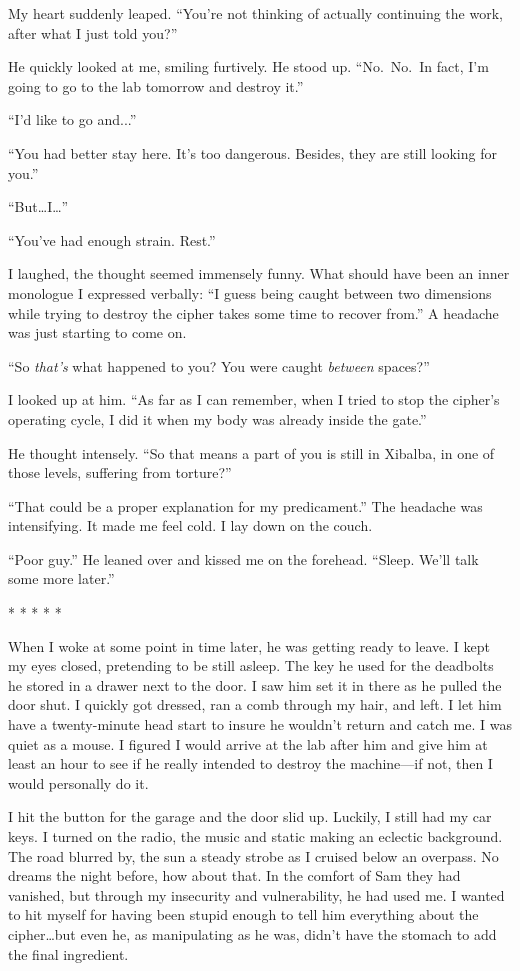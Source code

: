 \documentclass[
]{article}
\begin{document}
My heart suddenly leaped. ``You're not thinking of actually continuing
the work, after what I just told you?''

He quickly looked at me, smiling furtively. He stood up. ``No.~No.~In
fact, I'm going to go to the lab tomorrow and destroy it.''

``I'd like to go and...''

``You had better stay here. It's too dangerous. Besides, they are still
looking for you.''

``But\ldots I\ldots{}''

``You've had enough strain. Rest.''

I laughed, the thought seemed immensely funny. What should have been an
inner monologue I expressed verbally: ``I guess being caught between two
dimensions while trying to destroy the cipher takes some time to recover
from.'' A headache was just starting to come on.

``So \emph{that's} what happened to you? You were caught \emph{between}
spaces?''

I looked up at him. ``As far as I can remember, when I tried to stop the
cipher's operating cycle, I did it when my body was already inside the
gate.''

He thought intensely. ``So that means a part of you is still in Xibalba,
in one of those levels, suffering from torture?''

``That could be a proper explanation for my predicament.'' The headache
was intensifying. It made me feel cold. I lay down on the couch.

``Poor guy.'' He leaned over and kissed me on the forehead. ``Sleep.
We'll talk some more later.''

* * * * *

When I woke at some point in time later, he was getting ready to leave.
I kept my eyes closed, pretending to be still asleep. The key he used
for the deadbolts he stored in a drawer next to the door. I saw him set
it in there as he pulled the door shut. I quickly got dressed, ran a
comb through my hair, and left. I let him have a twenty-minute head
start to insure he wouldn't return and catch me. I was quiet as a mouse.
I figured I would arrive at the lab after him and give him at least an
hour to see if he really intended to destroy the machine---if not, then
I would personally do it.

I hit the button for the garage and the door slid up. Luckily, I still
had my car keys. I turned on the radio, the music and static making an
eclectic background. The road blurred by, the sun a steady strobe as I
cruised below an overpass. No dreams the night before, how about that.
In the comfort of Sam they had vanished, but through my insecurity and
vulnerability, he had used me. I wanted to hit myself for having been
stupid enough to tell him everything about the cipher\ldots but even he,
as manipulating as he was, didn't have the stomach to add the final
ingredient.
\end{document}
